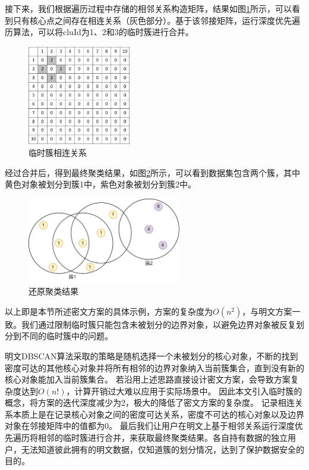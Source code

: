 接下来，我们根据遍历过程中存储的相邻关系构造矩阵，结果如图\ref{db_matrix}所示，可以看到只有核心点之间存在相连关系（灰色部分）。基于该邻接矩阵，运行深度优先遍历算法，可以将cluId为1、2和3的临时簇进行合并。

\begin{figure}[htbp]
	\centering
	\includegraphics[width=0.4\textwidth]{img/db_matrix.png}
	\caption{临时簇相连关系}
	\label{db_matrix}
\end{figure}

经过合并后，得到最终聚类结果，如图\ref{dbres}所示，可以看到数据集包含两个簇，其中黄色对象被划分到簇1中，紫色对象被划分到簇2中。
\begin{figure}[htbp]
	\centering
	\includegraphics[width=0.6\textwidth]{img/dbres.png}
	\caption{还原聚类结果}
	\label{dbres}
\end{figure}

以上即是本节所述密文方案的具体示例，方案的复杂度为$ O(n^2) $，与明文方案一致。我们通过限制临时簇只能包含未被划分的边界对象，以避免边界对象被反复划分到不同的临时簇中的问题。

明文DBSCAN算法采取的策略是随机选择一个未被划分的核心对象，不断的找到密度可达的其他核心对象并将所有相邻的边界对象纳入当前簇集合，直到没有新的核心对象能加入当前簇集合。
若沿用上述思路直接设计密文方案，会导致方案复杂度达到$ O(n!) $，计算开销过大难以应用于实际场景中。
因此本文引入临时簇的概念，将方案的迭代深度减少为2，极大的降低了密文方案的复杂度。
记录相连关系本质上是在记录核心对象之间的密度可达关系，密度不可达的核心对象以及边界对象在邻接矩阵中的值都为0。
最后我们让用户在明文上基于相邻关系运行深度优先遍历将相邻的临时簇进行合并，来获取最终聚类结果。各自持有数据的独立用户，无法知道彼此拥有的明文数据，仅知道簇的划分情况，达到了保护数据安全的目的。


